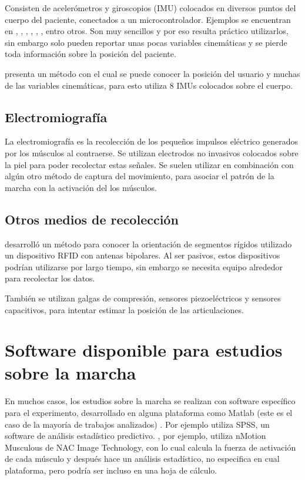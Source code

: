 Consisten de acelerómetros y giroscopios (IMU) colocados en diversos puntos del cuerpo del paciente, conectados a un microcontrolador. Ejemplos se encuentran en \cite{menz}, \cite{arif}, \cite{senanayake}, \cite{latt}, \cite{mazza}, \cite{hu}, entro otros. Son muy sencillos y por eso resulta práctico utilizarlos, sin embargo solo pueden reportar unas pocas variables cinemáticas y se pierde toda información sobre la posición del paciente.

\cite{yuan} presenta un método con el cual se puede conocer la posición del usuario y muchas de las variables cinemáticas, para esto utiliza 8 IMUs colocados sobre el cuerpo.

\subsection{Electromiografía}

La electromiografía es la recolección de los pequeños impulsos eléctrico generados por los músculos al contraerse. Se utilizan electrodos no invasivos colocados sobre la piel para poder recolectar estas señales. Se suelen utilizar en combinación con algún otro método de captura del movimiento, para asociar el patrón de la marcha con la activación del los músculos. \cite{muro}

\subsection{Otros medios de recolección}

\cite{krigslund} desarrolló un método para conocer la orientación de segmentos rígidos utilizado un dispositivo RFID con antenas bipolares. Al ser pasivos, estos dispositivos podrían utilizarse por largo tiempo, sin embargo se necesita equipo alrededor para recolectar los datos. 

También se utilizan galgas de compresión, sensores piezoeléctricos y sensores capacitivos, para intentar estimar la posición de las articulaciones. \citep{muro}


\section[Software disponible]{Software disponible para estudios sobre la marcha}

En muchos casos, los estudios sobre la marcha se realizan con software específico para el experimento, desarrollado en alguna plataforma como Matlab (este es el caso de la mayoría de trabajos analizados) \citep{cuaya, mrozowski, eskinazi, senanayake, prakash, punt, menguc, bruijn}. Por ejemplo \cite{menz} utiliza SPSS, un software de análisis estadístico predictivo. \cite{mizoguchi}, por ejemplo, utiliza nMotion Musculous de NAC Image Technology, con lo cual calcula la fuerza de activación de cada músculo y después hace un análisis estadístico, no especifica en cual plataforma, pero podría ser incluso en una hoja de cálculo. 

